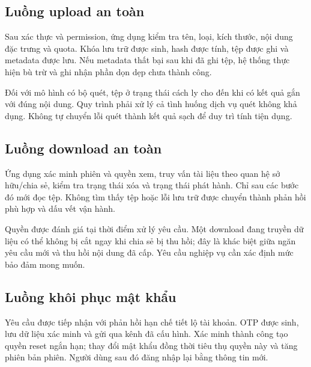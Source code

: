 \subsection{Luồng upload an toàn}
Sau xác thực và permission, ứng dụng kiểm tra tên, loại, kích thước, nội dung đặc trưng và quota. Khóa lưu trữ được sinh, hash được tính, tệp được ghi và metadata được lưu. Nếu metadata thất bại sau khi đã ghi tệp, hệ thống thực hiện bù trừ và ghi nhận phần dọn dẹp chưa thành công.

Đối với mô hình có bộ quét, tệp ở trạng thái cách ly cho đến khi có kết quả gắn với đúng nội dung. Quy trình phải xử lý cả tình huống dịch vụ quét không khả dụng. Không tự chuyển lỗi quét thành kết quả sạch để duy trì tính tiện dụng.
\subsection{Luồng download an toàn}
Ứng dụng xác minh phiên và quyền xem, truy vấn tài liệu theo quan hệ sở hữu/chia sẻ, kiểm tra trạng thái xóa và trạng thái phát hành. Chỉ sau các bước đó mới đọc tệp. Không tìm thấy tệp hoặc lỗi lưu trữ được chuyển thành phản hồi phù hợp và dấu vết vận hành.

Quyền được đánh giá tại thời điểm xử lý yêu cầu. Một download đang truyền dữ liệu có thể không bị cắt ngay khi chia sẻ bị thu hồi; đây là khác biệt giữa ngăn yêu cầu mới và thu hồi nội dung đã cấp. Yêu cầu nghiệp vụ cần xác định mức bảo đảm mong muốn.
\subsection{Luồng khôi phục mật khẩu}
Yêu cầu được tiếp nhận với phản hồi hạn chế tiết lộ tài khoản. OTP được sinh, lưu dữ liệu xác minh và gửi qua kênh đã cấu hình. Xác minh thành công tạo quyền reset ngắn hạn; thay đổi mật khẩu đồng thời tiêu thụ quyền này và tăng phiên bản phiên. Người dùng sau đó đăng nhập lại bằng thông tin mới.

